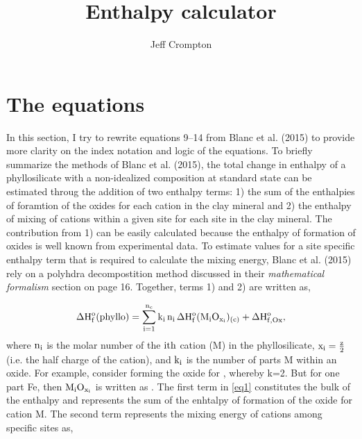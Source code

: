 \documentclass[11pt]{article} %
\title{Enthalpy calculator}
\author{Jeff Crompton}
\begin{document}
\maketitle

\section{The equations}

In this section, I try to rewrite equations 9--14 from Blanc et al. (2015) to provide more clarity on the index notation and logic of the equations. To briefly summarize the methods of Blanc et al. (2015), the total change in enthalpy of a phyllosilicate with a non-idealized composition at standard state can be estimated throug the addition of two enthalpy terms: 1) the sum of the enthalpies of foramtion of the oxides for each cation in the clay mineral and 2) the enthalpy of mixing of cations within a given site for each site in the clay mineral. The contribution from 1) can be easily calculated because the enthalpy of formation of oxides is well known from experimental data. To estimate values for a site specific enthalpy term that is required to calculate the mixing energy, Blanc et al. (2015) rely on a polyhdra decompostition method discussed in their \emph{mathematical formalism} section on page 16. Together, terms 1) and 2) are written as,

\begin{equation}
\rm \Delta H_f^o(phyllo)
 = \sum_{i=1}^{n_c} k_i\,n_i\,\Delta H_f^o(M_iO_{x_i})_{(c)}+\Delta H_{f,Ox}^o,
\label{eq1}
\end{equation}
where $\rm n_i$ is the molar number of the $\rm i{th}$ cation (M) in the phyllosilicate, $\rm x_i = \frac{z}{2}$ (i.e. the half charge of the cation), and $\rm k_i$ is the number of parts M within an oxide. For example, consider  forming the oxide for , whereby k=2. But for one part Fe, then $\rm M_iO_{x_i}$ is written  as . The first term in \ref{eq1} constitutes the bulk of the enthalpy and represents the sum of the enhtalpy of formation of the oxide for cation M. The second term represents the mixing energy of cations among specific sites as,
\end{document}
